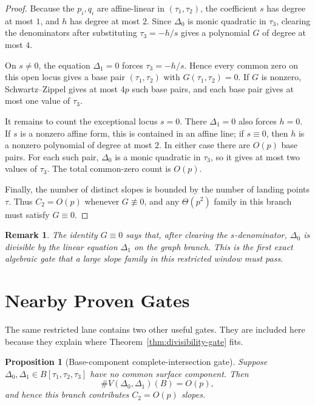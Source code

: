 \documentclass[11pt]{article}
\newtheorem{proposition}{Proposition}
\newtheorem{remark}{Remark}
\newcommand{\Deltaone}{\Delta_1}
\newcommand{\Deltazero}{\Delta_0}
\newcommand{\tauone}{\tau_1}
\newcommand{\tautwo}{\tau_2}
\newcommand{\tauthree}{\tau_3}
\newcommand{\Ctwo}{C_2}
\begin{document}
\begin{proof}
Because the \(p_i,q_i\) are affine-linear in \((\tauone,\tautwo)\), the
coefficient \(s\) has degree at most \(1\), and \(h\) has degree at most \(2\).
Since \(\Deltazero\) is monic quadratic in \(\tauthree\), clearing the
denominators after substituting \(\tauthree=-h/s\) gives a polynomial \(G\) of
degree at most \(4\).

On \(s\ne0\), the equation \(\Deltaone=0\) forces \(\tauthree=-h/s\).  Hence
every common zero on this open locus gives a base pair
\((\tauone,\tautwo)\) with \(G(\tauone,\tautwo)=0\).  If \(G\) is nonzero,
Schwartz--Zippel gives at most \(4p\) such base pairs, and each base pair gives
at most one value of \(\tauthree\).

It remains to count the exceptional locus \(s=0\).  There \(\Deltaone=0\) also
forces \(h=0\).  If \(s\) is a nonzero affine form, this is contained in an
affine line; if \(s\equiv0\), then \(h\) is a nonzero polynomial of degree at
most \(2\).  In either case there are \(O(p)\) base pairs.  For each such pair,
\(\Deltazero\) is a monic quadratic in \(\tauthree\), so it gives at most two
values of \(\tauthree\).  The total common-zero count is \(O(p)\).

Finally, the number of distinct slopes is bounded by the number of landing
points \(\tau\).  Thus \(\Ctwo=O(p)\) whenever \(G\not\equiv0\), and any
\(\Theta(p^2)\) family in this branch must satisfy \(G\equiv0\).
\end{proof}

\begin{remark}
The identity \(G\equiv0\) says that, after clearing the \(s\)-denominator,
\(\Deltazero\) is divisible by the linear equation \(\Deltaone\) on the graph
branch.  This is the first exact algebraic gate that a large slope family in
this restricted window must pass.
\end{remark}

\section{Nearby Proven Gates}
\label{sec:nearby-gates}

The same restricted lane contains two other useful gates.  They are included
here because they explain where Theorem~\ref{thm:divisibility-gate} fits.

\begin{proposition}[Base-component complete-intersection gate]
\label{prop:complete-intersection}
Suppose \(\Deltazero,\Deltaone\in B[\tauone,\tautwo,\tauthree]\) have no common
surface component.  Then
\[
  \#V(\Deltazero,\Deltaone)(B)=O(p),
\]
and hence this branch contributes \(\Ctwo=O(p)\) slopes.
\end{proposition}
\end{document}
